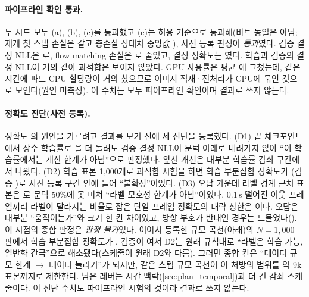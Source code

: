 \paragraph{파이프라인 확인 통과.} 두 시드 모두 (a), (b), (c)를 통과했고 (e)는 허용 기준으로 통과해(비트 동일은 아님; 재개 첫 스텝 손실은 같고 총손실 상대차 중앙값 ), 사전 등록 판정이 \emph{통과}였다. 검증 결정 NLL은 로, flow matching 손실은 로 줄었고, 결정 정확도는 였다. 학습과 검증의 결정 NLL이 거의 같아 과적합은 보이지 않았다. GPU 사용률은 평균 에 그쳤는데, 같은 시간에 파드 CPU 할당량이 거의 찼으므로 이미지 적재·전처리가 CPU에 묶인 것으로 보인다(원인 미측정). 이 수치는 모두 파이프라인 확인이며 결과로 쓰지 않는다.

\paragraph{정확도 진단(사전 등록).} 정확도 의 원인을 가르려고 결과를 보기 전에 세 진단을 등록했다. (D1) 끝 체크포인트에서 상수 학습률로 을 더 돌려도 검증 결정 NLL이 문턱 아래로 내려가지 않아 ``이 학습률에서는 계산 한계가 아님''으로 판정했다. 앞선 개선은 대부분 학습률 감쇠 구간에서 나왔다. (D2) 학습 표본 1,000개로 과적합 시험을 하면 학습 부분집합 정확도가 (검증 )로 사전 등록 구간 안에 들어 ``불확정''이었다. (D3) 오답 가운데 라벨 경계 근처 표본은 로 문턱 50\%에 못 미쳐 ``라벨 모호성 한계가 아님''이었다. 0.1\,s 떨어진 이웃 프레임끼리 라벨이 달라지는 비율로 잡은 단일 프레임 정확도의 대략 상한은 이다. 오답은 대부분 ``움직이는가''와 크기 한 칸 차이였고, 방향 부호가 반대인 경우는 드물었다(). 이 시점의 종합 판정은 \emph{판정 불가}였다. 이어서 등록한 규모 곡선(아래)의 $N{=}1{,}000$ 판에서 학습 부분집합 정확도가 , 검증이 여서 D2는 원래 규칙대로 ``라벨은 학습 가능, 일반화 간극''으로 해소됐다(스케줄이 원래 D2와 다름). 그러면 종합 칸은 ``데이터 규모 한계 $\rightarrow$ 데이터 늘리기''가 되지만, 같은 스텝 규모 곡선이 이 처방의 범위를 약 9k 표본까지로 제한한다. 남은 레버는 시간 맥락(\cref{sec:plan_temporal})과 더 긴 감쇠 스케줄이다. 이 진단 수치도 파이프라인 시험의 것이라 결과로 쓰지 않는다.

